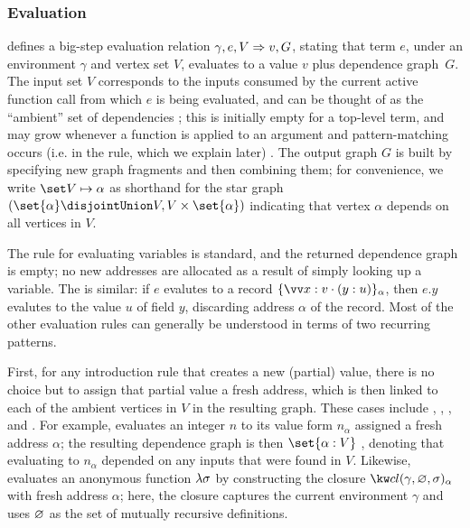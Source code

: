 \subsubsection{Evaluation}
 defines a big-step evaluation relation $\gamma, e, V \Rightarrow v, G$, stating that term $e$,
under an environment $\gamma$ and vertex set $V$, evaluates to a value $v$ plus dependence graph~$G$. The
input set $V$ corresponds to the inputs consumed by the current active function call from which $e$ is being
evaluated, and can be thought of as the ``ambient'' set of  dependencies ; this is
initially empty for a top-level term, and may grow whenever a function is applied to an argument and
pattern-matching occurs (i.e. in the  rule, which we explain later) . The output graph $G$ is built by specifying new graph fragments and then combining them; for
convenience, we write $\inStar{V}{\alpha}$ as shorthand for the star graph $(\set{\alpha} \disjointUnion V, V
\times \set{\alpha})$ indicating that vertex $\alpha$ depends on all vertices in $V$.

The  rule for evaluating variables is standard, and the returned dependence graph is
empty; no new addresses are allocated as a result of simply looking up a variable. The
 is similar: if $e$ evalutes to a record $\annRec{\seq{\bind{x}{v}} \cons
(\bind{y}{u})}{\alpha}$, then $e.y$ evalutes to the value $u$ of field $y$, discarding address $\alpha$ of the
record. Most of the other evaluation rules can generally be understood in terms of two recurring patterns.

First, for any introduction rule that creates a new (partial) value, there is no choice  but to
assign that partial value a fresh address, which is then linked to each of the ambient vertices in $V$ in the
resulting graph. These cases include , ,
, and . For example,  evaluates an
integer $n$ to its value form $n_{\alpha}$ assigned a fresh address $\alpha$; the resulting dependence graph
is then $\set{\bind{\alpha}{V}}$ , denoting that evaluating to $n_\alpha$
depended on any inputs that were found in $V$. Likewise,  evaluates an anonymous
function $\lambda{\sigma}$ by constructing the closure $\exClosure{\gamma}{\envEmpty}{\sigma}_\alpha$ with
fresh address $\alpha$; here, the closure captures the current environment $\gamma$ and uses $\varnothing$ as
the set of mutually recursive definitions.

